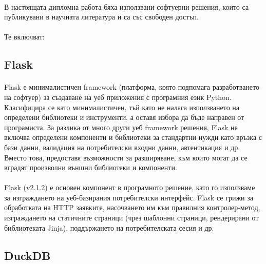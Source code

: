 \documentclass[pdftex,cyrillic,14pt,a4page,twoside,openright]{extreport}
\begin{document}
\paragraph{}
В настоящата дипломна работа бяха използвани софтуерни решения, които са публикувани в научната литература и са със свободен достъп.

\paragraph{}
Те включват:

\subsection{Flask}
\paragraph{}
Flask \cite{flask} е минималистичен framework (платформа, която подпомага разработването на софтуер) за създаване на уеб приложения с програмния език Python. Класифицира се като минималистичен, тъй като не налага използването на определени библиотеки и инструменти, а оставя избора да бъде направен от програмиста. За разлика от много други уеб framework решения, Flask не включва определени компоненти и библиотеки за стандартни нужди като връзка с бази данни, валидация на потребителски входни данни, автентикация и др. Вместо това, предоставя възможности за разширяване, към които могат да се вградят произволни външни библиотеки и компоненти.

\paragraph{}
Flask (v2.1.2) е основен компонент в програмното решение, като го използваме за изграждането на уеб-базирания потребителски интерфейс. Flask се грижи за обработката на HTTP заявките, насочването им към правилния контролер-метод, изграждането на статичните страници (чрез шаблонни страници, рендерирани от библиотеката Jinja), поддържането на потребителската сесия и др.

\subsection{DuckDB}\label{sec:duckdb}
\end{document}
